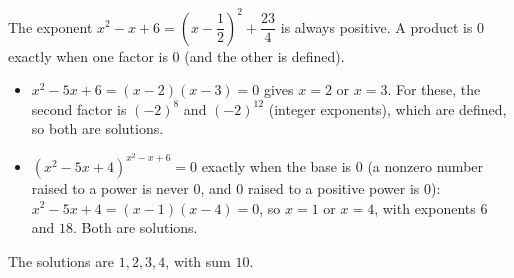 The exponent $x^2-x+6=\left(x-\dfrac{1}{2}\right)^2+\dfrac{23}{4}$ is always positive. A product is $0$ exactly when one factor is $0$ (and the other is defined).
\begin{itemize}
\item $x^2-5x+6=(x-2)(x-3)=0$ gives $x=2$ or $x=3$. For these, the second factor is $(-2)^{8}$ and $(-2)^{12}$ (integer exponents), which are defined, so both are solutions.
\item $\left(x^2-5x+4\right)^{x^2-x+6}=0$ exactly when the base is $0$ (a nonzero number raised to a power is never $0$, and $0$ raised to a positive power is $0$): $x^2-5x+4=(x-1)(x-4)=0$, so $x=1$ or $x=4$, with exponents $6$ and $18$. Both are solutions.
\end{itemize}
The solutions are $1,2,3,4$, with sum $\boxed{10}$.
